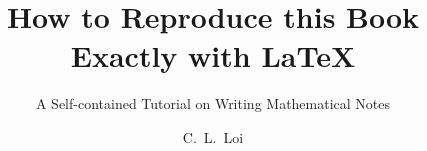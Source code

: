 \documentclass{scrbook}
\title{How to Reproduce this Book Exactly with \LaTeX}
\subtitle{A Self-contained Tutorial on Writing Mathematical Notes}
\author{C.~L.~Loi}
\begin{document}
\renewcommand{\thepage}{Cover Page}

\frontmatter


\mainmatter












\backmatter

\end{document}
